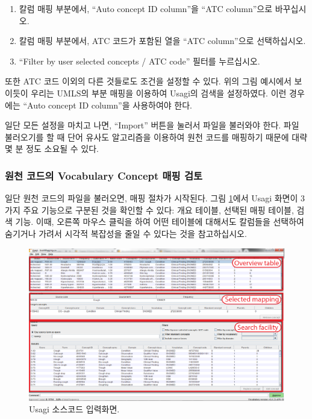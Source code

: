 \documentclass[11pt]{book}
\providecommand{\tightlist}{%
  \setlength{\itemsep}{0pt}\setlength{\parskip}{0pt}}
\theoremstyle{definition}
\theoremstyle{definition}
\theoremstyle{definition}
\theoremstyle{remark}
\begin{document}
\begin{enumerate}
\def\labelenumi{\arabic{enumi}.}
\tightlist
\item
  칼럼 매핑 부분에서, ``Auto concept ID column''을 ``ATC column''으로
  바꾸십시오.
\item
  칼럼 매핑 부분에서, ATC 코드가 포함된 열을 ``ATC column''으로
  선택하십시오.
\item
  ``Filter by user selected concepts / ATC code'' 필터를 누르십시오.
\end{enumerate}

또한 ATC 코드 이외의 다른 것들로도 조건을 설정할 수 있다. 위의 그림
예시에서 보이듯이 우리는 UMLS의 부분 매핑을 이용하여 Usagi의 검색을
설정하였다. 이런 경우에는 ``Auto concept ID column''을 사용하여야 한다.

일단 모든 설정을 마치고 나면, ``Import'' 버튼을 눌러서 파일을 불러와야
한다. 파일 불러오기를 할 때 단어 유사도 알고리즘을 이용하여 원천 코드를
매핑하기 때문에 대략 몇 분 정도 소요될 수 있다.

\subsubsection*{원천 코드의 Vocabulary Concept 매핑
검토}\label{--vocabulary-concept--}

일단 원천 코드의 파일을 불러오면, 매핑 절차가 시작된다. 그림
\ref{fig:usagiOverview}에서 Usagi 화면이 3가지 주요 기능으로 구분된 것을
확인할 수 있다: 개요 테이블, 선택된 매핑 테이블, 검색 기능. 이때, 오른쪽
마우스 클릭을 하여 어떤 테이블에 대해서도 칼럼들을 선택하여 숨기거나
가려서 시각적 복잡성을 줄일 수 있다는 것을 참고하십시오.

\begin{figure}

{\centering \includegraphics[width=1\linewidth]{images/ExtractTransformLoad/usagiOverview} 

}

\caption{Usagi 소스코드 입력화면.}\label{fig:usagiOverview}
\end{figure}
\end{document}
